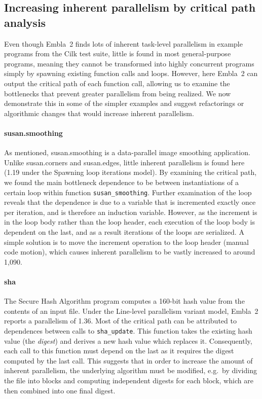 \subsection{Increasing inherent parallelism by critical path analysis} \label{sresults:increasing}

Even though Embla~2 finds lots of inherent task-level parallelism in example programs from the Cilk test suite, little is found in most general-purpose programs, meaning they cannot be transformed into highly concurrent programs simply by spawning existing function calls and loops.
However, here Embla~2 can output the critical path of each function call, allowing us to examine the bottlenecks that prevent greater parallelism from being realized.
We now demonstrate this in some of the simpler examples and suggest refactorings or algorithmic changes that would increase inherent parallelism.

\paragraph{\textsf{susan.smoothing}}

As mentioned, \textsf{susan.smoothing} is a data-parallel image smoothing application.
Unlike \textsf{susan.corners} and \textsf{susan.edges}, little inherent parallelism is found here (1.19 under the \textsf{Spawning loop iterations} model).
By examining the critical path, we found the main bottleneck dependence to be between instantiations of a certain loop within function \texttt{susan\_smoothing}.
Further examination of the loop reveals that the dependence is due to a variable that is incremented exactly once per iteration, and is therefore an induction variable.
However, as the increment is in the loop body rather than the loop header, each execution of the loop body is dependent on the last, and as a result iterations of the loops are serialized.
A simple solution is to move the increment operation to the loop header (manual code motion), which causes inherent parallelism to be vastly increased to around 1,090.

\paragraph{\textsf{sha}}

The Secure Hash Algorithm program computes a 160-bit hash value from the contents of an input file.
Under the \textsf{Line-level parallelism} variant model, Embla~2 reports a parallelism of 1.36.
Most of the critical path can be attributed to dependences between calls to \texttt{sha\_update}.
This function takes the existing hash value (the \emph{digest}) and derives a new hash value which replaces it.
Consequently, each call to this function must depend on the last as it requires the digest computed by the last call.
This suggests that in order to increase the amount of inherent parallelism, the underlying algorithm must be modified, e.g.\ by dividing the file into blocks and computing independent digests for each block, which are then combined into one final digest.

